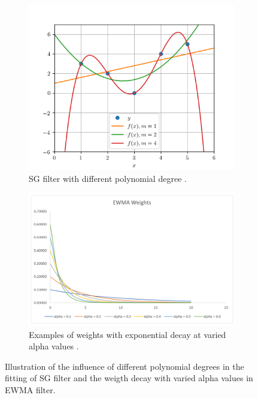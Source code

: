 \begin{figure}[h]
    \centering
    \begin{subfigure}[t]{0.4\textwidth}
      \includegraphics[width=\linewidth]{imgs/pre-processing/demo-polynomial-fitting.png}
      \caption{SG filter with different polynomial degree \citep{taalSmoothingYourData2017}.} \label{fig:filters-sg}
    \end{subfigure}%
    \hspace{2em}%
    \begin{subfigure}[t]{0.5\textwidth}
      \includegraphics[width=\linewidth]{imgs/pre-processing/demo-weight-ewma.png}
      \caption{Examples of weights with exponential decay at varied alpha values \citep{cfiExponentiallyWeightedMoving2022}.} \label{fig:filters-ewma}
    \end{subfigure}%
  \caption{Illustration of the influence of different polynomial degrees in the fitting of SG filter and the weigth decay with varied alpha values in EWMA filter.} \label{fig:filters}
\end{figure}

